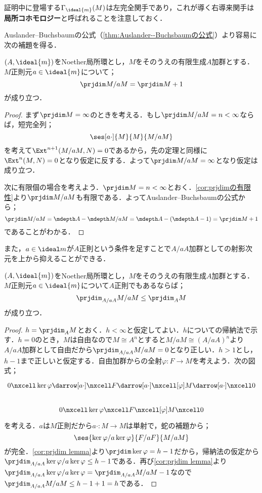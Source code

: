 証明中に登場する$\Gamma_{\ideal{m}}(M)$は左完全関手であり，これが導く右導来関手は\textbf{局所コホモロジー}と呼ばれることを注意しておく．

Auslander--Buchsbaumの公式（\ref{thm:Auslander--Buchsbaumの公式}）より容易に次の補題を得る．

\begin{lem}\label{lem:prjdim M/aM}
	$(A,\ideal{m})$をNoether局所環とし，$M$をそのうえの有限生成$A$加群とする．$M$正則元$a\in\ideal{m}$について；
	\[\prjdim M/aM=\prjdim M+1\]
	が成り立つ．
\end{lem}

\begin{proof}
	まず$\prjdim M=\infty$のときを考える．もし$\prjdim M/aM=n<\infty$ならば，短完全列；
	\[\ses[a\cdot]{M}{M}{M/aM}\]
	を考えて$\Ext^{n+1}(M/aM,N)=0$であるから，先の定理と同様に$\Ext^n(M,N)=0$となり仮定に反する．よって$\prjdim M/aM=\infty$となり仮定は成り立つ．
	
	次に有限個の場合を考えよう．$\prjdim M=n<\infty$とおく．\ref{cor:prjdimの有限性}より$\prjdim M/aM$も有限である．よってAuslander--Buchsbaumの公式から；
	\[\prjdim M/aM=\mdepth A-\mdepth M/aM=\mdepth A-(\mdepth A-1)=\prjdim M+1\]
	であることがわかる．
\end{proof}

また，$a\in\ideal m$が$A$正則という条件を足すことで$A/aA$加群としての射影次元を上から抑えることができる．

\begin{lem}\label{lem:prjdim_A/aA M/aM}
	$(A,\ideal{m})$をNoether局所環とし，$M$をそのうえの有限生成$A$加群とする．$M$正則元$a\in\ideal{m}$について$A$正則でもあるならば；
	\[\prjdim_{A/aA} M/aM\leq \prjdim_A M\]
	が成り立つ．
\end{lem}

\begin{proof}
	$h=\prjdim_A M$とおく．$h<\infty$と仮定してよい．$h$についての帰納法で示す．$h=0$のとき，$M$は自由なので$M\cong A^n$とすると$M/aM\cong(A/aA)^n$より$A/aA$加群として自由だから$\prjdim_{A/aA}M/aM=0$となり正しい．$h>1$とし，$h-1$まで正しいと仮定する．自由加群からの全射$\varphi:F\to M$を考えよう．次の図式；
	\[\begin{tikzcd}
		0\nxcell\ker\varphi\darrow[a\cdot]\nxcell F\darrow[a\cdot]\nxcell[\varphi]M\darrow[a\cdot]\nxcell0\\
		0\nxcell \ker\varphi\nxcell F\nxcell[\varphi]M\nxcell0
	\end{tikzcd}\]
	を考える．$a$は$M$正則だから$a\cdot:M\to M$は単射で，蛇の補題から；
	\[\ses{\ker\varphi/a\ker\varphi}{F/aF}{M/aM}\]
	が完全．\ref{cor:prjdim lemma}より$\prjdim\ker\varphi=h-1$だから，帰納法の仮定から$\prjdim_{A/aA}\ker\varphi/a\ker\varphi\leq h-1$である．再び\ref{cor:prjdim lemma}より$\prjdim_{A/aA}\ker\varphi/a\ker\varphi=\prjdim_{A/aA}M/aM-1$なので$\prjdim_{A/aA}M/aM\leq h-1+1=h$である．
\end{proof}


